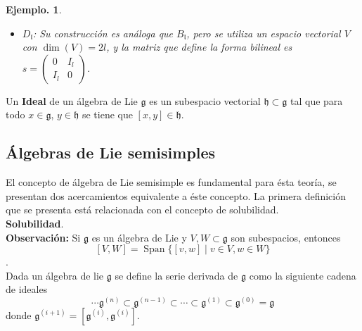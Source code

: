\documentclass[11pt,a4paper]{article}
\newtheorem{example}{Ejemplo.}
\newcommand{\Span}{\operatorname{Span}}
\newcommand{\suchthat}{\mid}
\begin{document}
\begin{example}
\begin{itemize}
         $$ \mathfrak{o}(2l+1, \mathbb{C})=  \{ x:V \rightarrow V \suchthat f(xv,w)=-f(v,xw) \} $$ , si se escribe $x=\begin{pmatrix} a & b_1 & b_2 \\
         c_1 & m & n \\
         c_2 & p & q\end{pmatrix}$ $x \in \mathfrak{o}(2l+1, \mathbb{C})$ si y sólo si $\mathcal{S}x= -x^t \mathcal{S}$, de dónde se obtienen las condiciones $a=0$, $c_1=-b_2^t$, $c_2=-b_1^t$, $q=-m^t$, $n^t=-n$, $p^t=-p$, de dónde $Tr(x)=0$, de ésta forma se puede construir una base para $\mathfrak{o}(2l+1,\mathbb{C})$ y se obtiene que $\dim (\\mathfrak{o}(2l+1,\mathbb{C})= 2l^2+l$.
         \item $D_\mathfrak{l}$: Su construcción es análoga que $B_\mathfrak{l}$, pero se utiliza un espacio vectorial $V$ con $\dim(V)=2l$, y la matriz que define la forma bilineal es $s=\begin{pmatrix} 0 & I_l \\
         I_l & 0\end{pmatrix}$.
         \end{itemize}
         \end{example}
         Un \textbf{Ideal} de un álgebra de Lie $\mathfrak{g}$ es un subespacio vectorial $\mathfrak{h}\subset \mathfrak{g} $ tal que para todo $x\in \mathfrak{g}$, $y\in \mathfrak{h}$ se tiene que $[x,y]\in \mathfrak{h}$.
\subsection{Álgebras de Lie semisimples}
El concepto de álgebra de Lie semisimple es fundamental para ésta teoría, se presentan dos acercamientos equivalente a éste concepto. La primera definición que se presenta está relacionada con el concepto de solubilidad.\\

\textbf{Solubilidad}.\\
\textbf{Observación:} Si $\mathfrak{g}$ es un álgebra de Lie y $V,W\subset \mathfrak{g}$ son subespacios, entonces
$$[V,W]=\Span\{[v,w] \suchthat v\in V, w\in W\}$$. \\
Dada un álgebra de lie $\mathfrak{g}$ se define la serie derivada de $\mathfrak{g}$ como la siguiente cadena de ideales
$$\cdots\mathfrak{g}^{(n)} \subset \mathfrak{g}^{(n-1)} \subset \cdots \subset \mathfrak{g}^{(1)} \subset \mathfrak{g}^{(0)}=\mathfrak{g}  $$
donde $\mathfrak{g}^{(i+1)}= [\mathfrak{g}^{(i)}, \mathfrak{g}^{(i)}]$.\\
\end{document}
